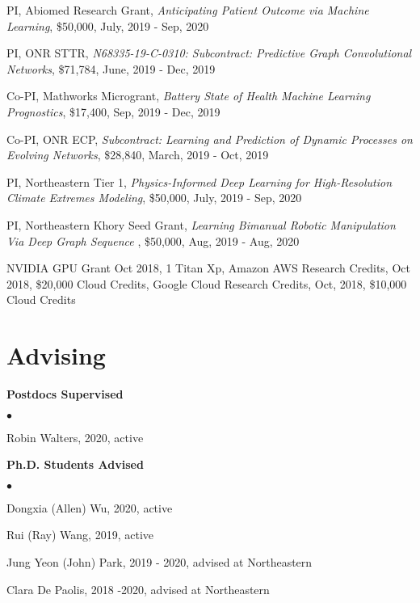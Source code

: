 \documentclass[margin,line]{res}
\newenvironment{list2}{
  \begin{list}{$\bullet$}{%
      \setlength{\itemsep}{0in}
      \setlength{\parsep}{0in} \setlength{\parskip}{0in}
      \setlength{\topsep}{0in} \setlength{\partopsep}{0in} 
      \setlength{\leftmargin}{0.2in}}}{\end{list}}
\begin{document}
\begin{resume}
\begin{enumerate}[label={[G\arabic*]}]
\item PI, {Abiomed Research Grant},    \textit{Anticipating Patient Outcome via Machine Learning}, \$50,000, July, 2019 - Sep, 2020

\item PI,  {ONR STTR}, \textit{N68335-19-C-0310: Subcontract: Predictive Graph Convolutional Networks},  \$71,784, June, 2019 - Dec, 2019


\item Co-PI,  {Mathworks Microgrant},    \textit{Battery State of Health Machine Learning Prognostics}, \$17,400,  Sep, 2019 - Dec, 2019
 
\item Co-PI,  {ONR ECP}, \textit{Subcontract: Learning and Prediction of Dynamic Processes on Evolving Networks}, \$28,840,  March, 2019 - Oct, 2019	

\item PI,  Northeastern Tier 1, \textit{Physics-Informed Deep Learning for High-Resolution Climate Extremes Modeling}, \$50,000, July, 2019 - Sep, 2020

\item PI, Northeastern Khory Seed Grant, \textit{Learning Bimanual Robotic Manipulation Via Deep Graph Sequence }, \$50,000,  Aug, 2019 - Aug, 2020	

\item NVIDIA GPU Grant Oct 2018, 1  Titan Xp,  Amazon AWS Research Credits, Oct  2018, \$20,000 Cloud Credits, Google Cloud Research Credits, Oct, 2018, \$10,000 Cloud Credits

\end{enumerate} 



\section{\sc Advising }
{\bf Postdocs Supervised} \\


\begin{list2}
\item Robin Walters, 2020, active 
\end{list2}




{\bf Ph.D. Students Advised} \\

\begin{list2}
\item Dongxia (Allen) Wu, 2020, active
\item Rui (Ray) Wang, 2019, active 
\item Jung Yeon (John) Park, 2019 - 2020,  advised at Northeastern
\item Clara De Paolis, 2018 -2020,  advised at Northeastern
\end{list2}



\end{resume}
\end{document}
